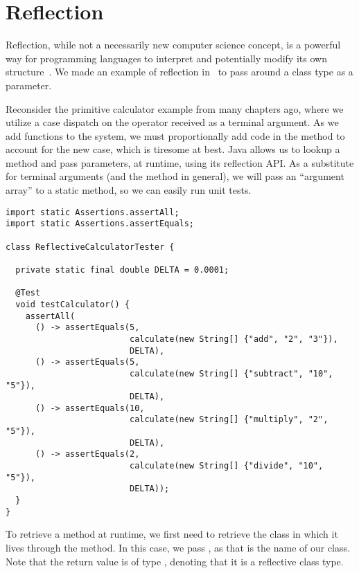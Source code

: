 \section{Reflection}

Reflection, while not a necessarily new computer science concept, is a powerful way for programming languages to interpret and potentially modify its own structure~. 
We made an example of reflection in~ to pass around a class type as a parameter. 

Reconsider the primitive calculator example from many chapters ago, where we utilize a case dispatch on the operator received as a terminal argument. 
As we add functions to the system, we must proportionally add code in the  method to account for the new case, which is tiresome at best. 
Java allows us to lookup a method and pass parameters, at runtime, using its reflection API.
As a substitute for terminal arguments (and the  method in general), we will pass an ``argument array'' to a static  method, so we can easily run unit tests.

\begin{lstlisting}[language=MyJava]
import static Assertions.assertAll;
import static Assertions.assertEquals;

class ReflectiveCalculatorTester {

  private static final double DELTA = 0.0001;

  @Test
  void testCalculator() {
    assertAll(
      () -> assertEquals(5, 
                         calculate(new String[] {"add", "2", "3"}), 
                         DELTA),
      () -> assertEquals(5, 
                         calculate(new String[] {"subtract", "10", "5"}), 
                         DELTA),
      () -> assertEquals(10, 
                         calculate(new String[] {"multiply", "2", "5"}), 
                         DELTA),
      () -> assertEquals(2, 
                         calculate(new String[] {"divide", "10", "5"}), 
                         DELTA));
  }
}
\end{lstlisting}

To retrieve a method at runtime, we first need to retrieve the class in which it lives through the  method. 
In this case, we pass , as that is the name of our class. 
Note that the return value is of type , denoting that it is a reflective class type.

